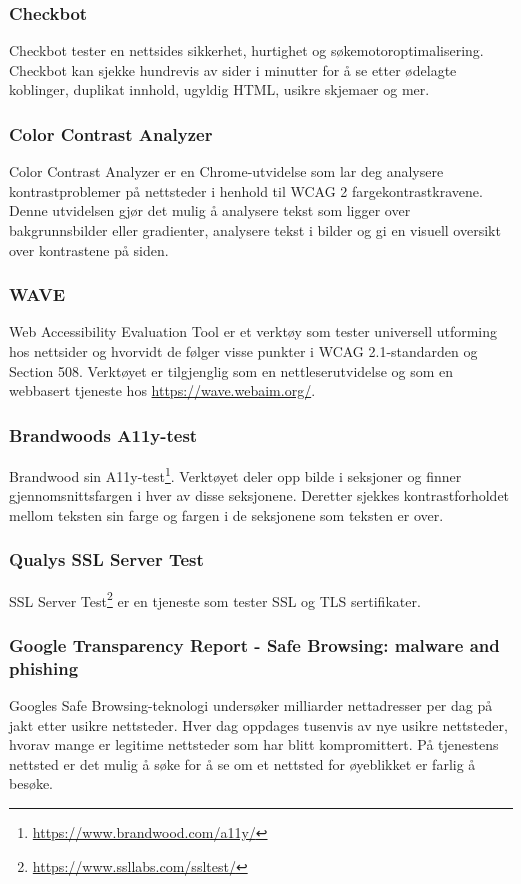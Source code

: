 \subsubsection{Checkbot}
\label{sec:checkbot}
Checkbot \cite{checkbot2019cth} tester en nettsides sikkerhet, hurtighet og søkemotoroptimalisering. Checkbot kan sjekke hundrevis av sider i minutter for å se etter ødelagte koblinger, duplikat innhold, ugyldig HTML, usikre skjemaer og mer.

\subsubsection{Color Contrast Analyzer}
\label{sec:color-contrast-analyzer}
Color Contrast Analyzer \cite{ncstate2013cca} er en Chrome-utvidelse som lar deg analysere kontrastproblemer på nettsteder i henhold til WCAG 2 fargekontrastkravene. Denne utvidelsen gjør det mulig å analysere tekst som ligger over bakgrunnsbilder eller gradienter, analysere tekst i bilder og gi en visuell oversikt over kontrastene på siden.

\subsubsection{WAVE}
\label{sec:wave}
Web Accessibility Evaluation Tool \cite{webaim2018wh} er et verktøy som tester universell utforming hos nettsider og hvorvidt de følger visse punkter i WCAG 2.1-standarden og Section 508. Verktøyet er tilgjenglig som en nettleserutvidelse og som en webbasert tjeneste hos \url{https://wave.webaim.org/}.

\subsubsection{Brandwoods A11y-test} 
\label{sec:brandwoods-a11y-test}
Brandwood sin A11y-test\footnote{\url{https://www.brandwood.com/a11y/}}. Verktøyet deler opp bilde i seksjoner og finner gjennomsnittsfargen i hver av disse seksjonene. Deretter sjekkes kontrastforholdet mellom teksten sin farge og fargen i de seksjonene som teksten er over.

\subsubsection{Qualys SSL Server Test}
\label{sec:qualys-ssl-server-test}
SSL Server Test\footnote{\url{https://www.ssllabs.com/ssltest/}} er en tjeneste som tester SSL og TLS sertifikater. 

\subsubsection{Google Transparency Report - Safe Browsing: malware and phishing}
\label{sec:google-transparency-report}
Googles Safe Browsing-teknologi \cite{google2019sbs} undersøker milliarder nettadresser per dag på jakt etter usikre nettsteder. Hver dag oppdages tusenvis av nye usikre nettsteder, hvorav mange er legitime nettsteder som har blitt kompromittert. På tjenestens nettsted er det mulig å søke for å se om et nettsted for øyeblikket er farlig å besøke.


